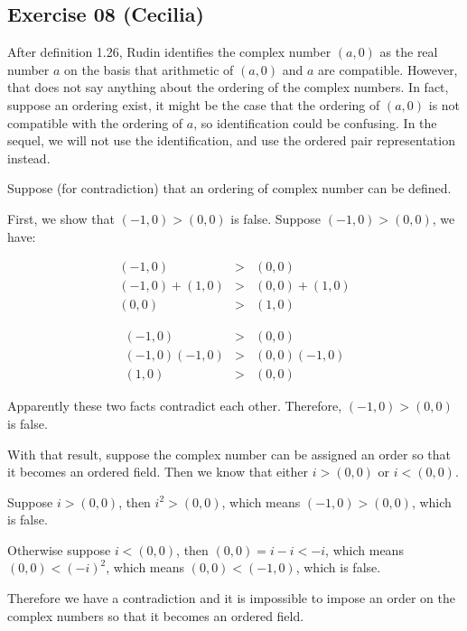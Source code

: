 \subsection*{Exercise 08 (Cecilia)}
After definition 1.26, Rudin identifies the complex number $ (a, 0) $ as the real number $ a $ on the basis that arithmetic of $ (a, 0) $ and $ a $ are compatible. However, that does not say anything about the ordering of the complex numbers. 
In fact, suppose an ordering exist, it might be the case that the ordering of $ (a, 0) $ is not compatible with the ordering of $ a $, so identification could be confusing. In the sequel, we will not use the identification, and use the ordered pair representation instead.

Suppose (for contradiction) that an ordering of complex number can be defined.

First, we show that $ (-1, 0) > (0, 0) $ is false. Suppose $ (-1, 0) > (0, 0) $, we have:

\begin{eqnarray*}
             (-1, 0) &>& (0, 0)          \\
    (-1, 0) + (1, 0) &>& (0, 0) + (1, 0) \\
              (0, 0) &>& (1, 0)
\end{eqnarray*}

\begin{eqnarray*}
           (-1, 0) &>& (0, 0)        \\
    (-1, 0)(-1, 0) &>& (0, 0)(-1, 0) \\
            (1, 0) &>& (0, 0)
\end{eqnarray*}

Apparently these two facts contradict each other. Therefore, $ (-1, 0) > (0, 0) $ is false.

With that result, suppose the complex number can be assigned an order so that it becomes an ordered field. Then we know that either $ i > (0, 0) $ or $ i < (0, 0) $.

Suppose $ i > (0, 0) $, then $ i^2 > (0, 0) $, which means $ (-1, 0) > (0, 0) $, which is false.

Otherwise suppose $ i < (0, 0) $, then $ (0, 0) = i - i < -i $, which means $ (0, 0) < (-i)^2 $, which means $ (0, 0) < (-1, 0) $, which is false.

Therefore we have a contradiction and it is impossible to impose an order on the complex numbers so that it becomes an ordered field.